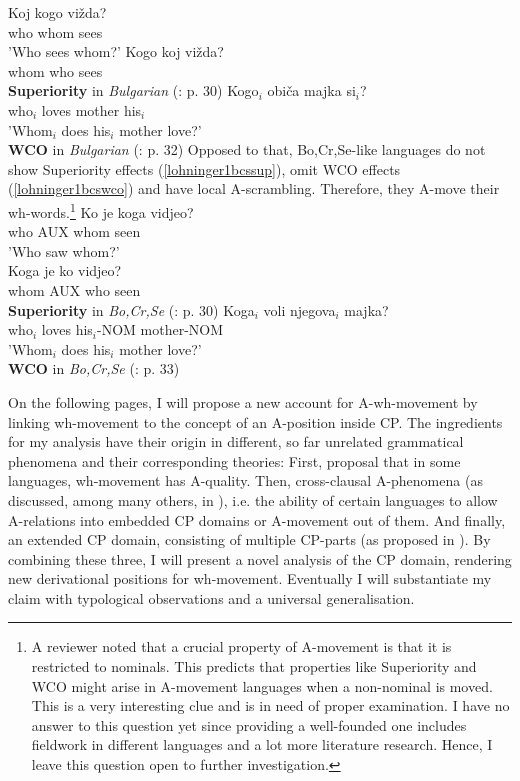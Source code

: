 \documentclass[output=paper,colorlinks,citecolor=brown]{langscibook}
\begin{document}
\ea\label{lohninger1bgsup}
  \ea
    \gll Koj kogo vi\v{z}da?\\
    who whom sees\\
    \glt 'Who sees whom?'
  \ex
    \gll * Kogo koj vi\v{z}da?\\
    {} whom who sees\\
    \glt {}
    \textbf{Superiority} in \emph{Bulgarian} (\citealp{richards1997}: p. 30)
  \z
\z
\ea\label{lohninger1bgwco}
  \gll * Kogo$_{i}$ obi\v{c}a majka si$_{i}$?\\
  {} who$_{i}$ loves mother his$_{i}$\\
  \glt 'Whom$_{i}$ does his$_{i}$ mother love?' \\
  \textbf{WCO} in \emph{Bulgarian} (\citealp{richards1997}: p. 32)
\z
Opposed to that, Bo,Cr,Se-like languages do not show Superiority effects (\ref{lohninger1bcssup}), omit WCO effects (\ref{lohninger1bcswco}) and have local A-scrambling. Therefore, they A-move their wh-words.\footnote{A reviewer noted that a crucial property of A-movement is that it is restricted to nominals. This predicts that properties like Superiority and WCO might arise in A-movement languages when a non-nominal is moved. This is a very interesting clue and is in need of proper examination. I have no answer to this question yet since providing a well-founded one includes fieldwork in different languages and a lot more literature research. Hence, I leave this question open to further investigation.}
\ea\label{lohninger1bcssup}
  \ea
    \gll Ko je koga vidjeo?\\
    who AUX whom seen\\
    \glt 'Who saw whom?'\\
  \ex
    \gll Koga je ko vidjeo?\\
    whom AUX who seen\\
    \glt {}
    \textbf{Superiority} in \emph{Bo,Cr,Se} (\citealp{richards1997}: p. 30)
  \z
\z 
\ea\label{lohninger1bcswco}
  \gll Koga$_{i}$ voli njegova$_{i}$ majka?\\
  who$_{i}$ loves his$_{i}$-NOM mother-NOM\\
  \glt 'Whom$_{i}$ does his$_{i}$ mother love?'\\
  \textbf{WCO} in \emph{Bo,Cr,Se} (\citealp{richards1997}: p. 33)
\z

On the following pages, I will propose a new account for A-wh-movement by linking wh-movement to the concept of an A-position inside CP. The ingredients for my analysis have their origin in different, so far unrelated grammatical phenomena and their corresponding theories: First, \cite{richards1997} proposal that in some languages, wh-movement has A-quality. Then, cross-clausal A-phenomena (as discussed, among many others, in \citealp{wurmbrand2018cross}), i.e. the ability of certain languages to allow A-relations into embedded CP domains or A-movement out of them. And finally, an extended CP domain, consisting of multiple CP-parts (as proposed in \citealp{rizzi1997fine}). By combining these three, I will present a novel analysis of the CP domain, rendering new derivational positions for wh-movement. Eventually I will substantiate my claim with typological observations and a universal generalisation. 
\end{document}
